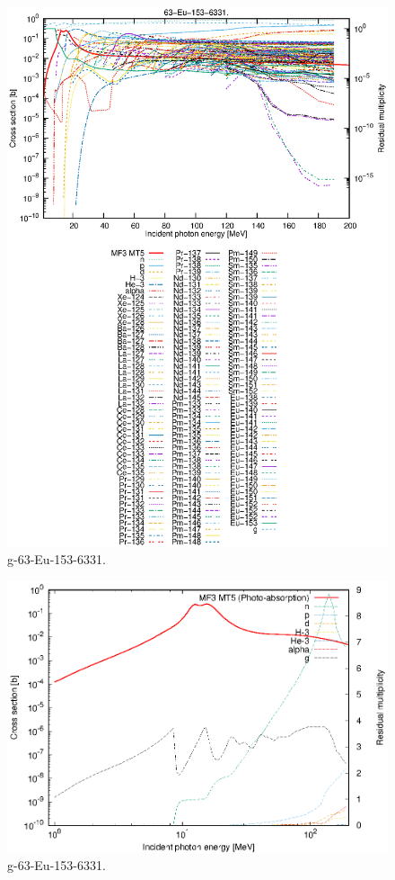 \begin{figure}
 \includegraphics[width=\linewidth]{eps/g_63-Eu-153_6331.eps}
  \caption{g-63-Eu-153-6331.}
\end{figure}
\newpage \clearpage

\begin{figure}
 \includegraphics[width=\linewidth]{eps-log/g_63-Eu-153_6331.eps}
 \caption{g-63-Eu-153-6331.}
\end{figure}
\newpage \clearpage

